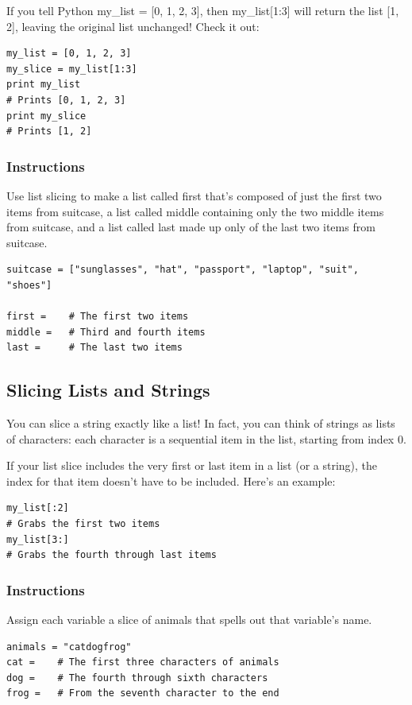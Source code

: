\documentclass[12pt,a4paper,final,twoside,onecolumn,titlepage]{book}
\begin{document}
If you tell Python my\_list = [0, 1, 2, 3], then my\_list[1:3] will return the list [1, 2], leaving the original list unchanged! Check it out:
\begin{lstlisting}
my_list = [0, 1, 2, 3]
my_slice = my_list[1:3]
print my_list
# Prints [0, 1, 2, 3]
print my_slice
# Prints [1, 2]
\end{lstlisting}
\subsubsection{Instructions}

Use list slicing to make a list called first that's composed of just the first two items from suitcase, a list called middle containing only the two middle items from suitcase, and a list called last made up only of the last two items from suitcase.

\begin{lstlisting}
suitcase = ["sunglasses", "hat", "passport", "laptop", "suit", "shoes"]

first =    # The first two items
middle =   # Third and fourth items
last =     # The last two items
\end{lstlisting}

\subsection{Slicing Lists and Strings}

You can slice a string exactly like a list! In fact, you can think of strings as lists of characters: each character is a sequential item in the list, starting from index 0.

If your list slice includes the very first or last item in a list (or a string), the index for that item doesn't have to be included. Here's an example:
\begin{lstlisting}
my_list[:2]
# Grabs the first two items
my_list[3:]
# Grabs the fourth through last items
\end{lstlisting}
\subsubsection{Instructions}

Assign each variable a slice of animals that spells out that variable's name.
\begin{lstlisting}
animals = "catdogfrog"
cat =    # The first three characters of animals
dog =    # The fourth through sixth characters
frog =   # From the seventh character to the end
\end{lstlisting}
\end{document}
